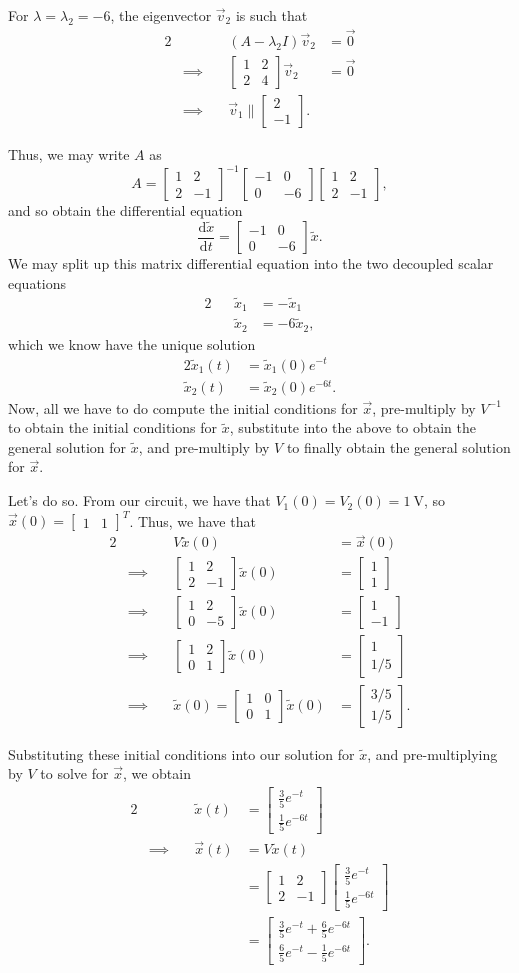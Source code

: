 \documentclass[letterpaper]{article}
\theoremstyle{remark}
\renewcommand{\tilde}[1]{\widetilde{#1}}
\newcommand{\dt}{\mathrm{d}t}
\newcommand{\diff}{\mathrm{d}}
\newcommand{\mat}[1]{\ensuremath{\begin{bmatrix}#1\end{bmatrix}}}
\newcommand{\eqn}[1]{\begin{alignat*}{2}#1\end{alignat*}}
\newcommand*{\thus}{&\implies\quad&}
\begin{document}
For $\lambda = \lambda_2 = -6$, the eigenvector $\vec{v}_2$ is such that
\eqn{
    && (A - \lambda_2 I)\vec{v}_2 &= \vec{0} \\
    \thus \mat{1 & 2 \\ 2 & 4}\vec{v}_2 &= \vec{0} \\
    \thus \vec{v}_1 \parallel \mat{2 \\ -1}.
}

Thus, we may write $A$ as
\[
    A = \mat{1 & 2 \\ 2 & -1}^{-1} \mat{-1 & 0 \\ 0 & -6} \mat{1 & 2 \\ 2 & -1},
\]
and so obtain the differential equation
\[
    \frac{\diff\tilde{x}}{\dt} = \mat{-1 & 0 \\ 0 & -6} \tilde{x}.
\]
We may split up this matrix differential equation into the two decoupled scalar equations
\eqn{
    && \tilde{x}_1 &= -\tilde{x}_1 \\
    && \tilde{x}_2 &= -6\tilde{x}_2,
}
which we know have the unique solution
\eqn{
    \tilde{x}_1(t) &= \tilde{x}_1(0)e^{-t} \\
    \tilde{x}_2(t) &= \tilde{x}_2(0)e^{-6t}.
}
Now, all we have to do compute the initial conditions for $\vec{x}$, pre-multiply by $V^{-1}$ to obtain the initial conditions for $\tilde{x}$, substitute into the above to obtain the general solution for $\tilde{x}$, and pre-multiply by $V$ to finally obtain the general solution for $\vec{x}$.

Let's do so. From our circuit, we have that $V_1(0) = V_2(0) = \SI{1}{\volt}$, so $\vec{x}(0) = \mat{1 & 1}^T$. Thus, we have that
\eqn{
    && V\tilde{x}(0) &= \vec{x}(0) \\
    \thus \mat{1 & 2 \\ 2 & -1}\tilde{x}(0) &= \mat{1 \\ 1} \\
    \thus \mat{1 & 2 \\ 0 & -5} \tilde{x}(0) &= \mat{1 \\ -1} \\
    \thus \mat{1 & 2 \\ 0 & 1} \tilde{x}(0) &= \mat{1 \\ 1/5} \\
    \thus \tilde{x}(0) = \mat{1 & 0 \\ 0 & 1} \tilde{x}(0) &= \mat{3/5 \\ 1/5}.
}

Substituting these initial conditions into our solution for $\tilde{x}$, and pre-multiplying by $V$ to solve for $\vec{x}$, we obtain
\eqn{
    && \tilde{x}(t) &= \mat{\frac{3}{5}e^{-t} \\ \frac{1}{5}e^{-6t}} \\
    \thus \vec{x}(t) &= V\tilde{x}(t) \\
    &&&= \mat{1 & 2 \\ 2 & -1}\mat{\frac{3}{5}e^{-t} \\ \frac{1}{5}e^{-6t}} \\
    &&&= \mat{\frac{3}{5} e^{-t} + \frac{6}{5} e^{-6t} \\ \frac{6}{5}e^{-t} - \frac{1}{5}e^{-6t}}.
}
\end{document}
